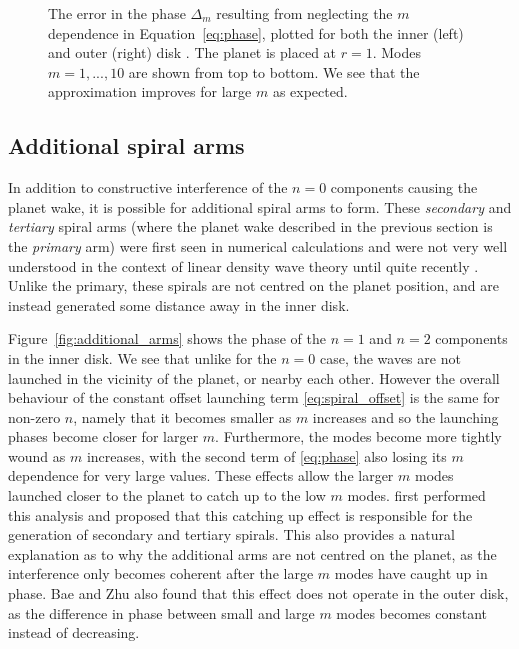 \begin{figure}
\begin{subfigure}[b]{0.49\textwidth}
        \label{fig:delta_m_outer}
    \end{subfigure}
       \caption{The error in the phase $\Delta_m$ resulting from neglecting the $m$ dependence in Equation~\eqref{eq:phase}, plotted for both the inner (left) and outer (right) disk \citep{ogilvie2002}.
       The planet is placed at $r=1$. Modes $m=1,...,10$ are shown from top to bottom.
       We see that the approximation improves for large $m$ as expected.}
       \label{fig:delta_m}
\end{figure}

\subsection{Additional spiral arms}

In addition to constructive interference of the $n=0$ components causing the planet wake, it is possible for additional spiral arms to form.
These \textit{secondary} and \textit{tertiary} spiral arms (where the planet wake described in the previous section is the \textit{primary} arm) were first seen in numerical calculations \citep{fung2015} and were not very well understood in the context of linear density wave theory until quite recently \citep{bae2018a,miranda2019a}.
Unlike the primary, these spirals are not centred on the planet position, and are instead generated some distance away in the inner disk.

Figure~\ref{fig:additional_arms} shows the phase of the $n=1$ and $n=2$ components in the inner disk.
We see that unlike for the $n=0$ case, the waves are not launched in the vicinity of the planet, or nearby each other.
However the overall behaviour of the constant offset launching term \eqref{eq:spiral_offset} is the same for non-zero $n$, namely that it becomes smaller as $m$ increases and so the launching phases become closer for larger $m$.
Furthermore, the modes become more tightly wound as $m$ increases, with the second term of \eqref{eq:phase} also losing its $m$ dependence for very large values.
These effects allow the larger $m$ modes launched closer to the planet to catch up to the low $m$ modes.
\citet{bae2018a} first performed this analysis and proposed that this catching up effect is responsible for the generation of secondary and tertiary spirals.
This also provides a natural explanation as to why the additional arms are not centred on the planet, as the interference only becomes coherent after the large $m$ modes have caught up in phase.
Bae and Zhu also found that this effect does not operate in the outer disk, as the difference in phase between small and large $m$ modes becomes constant instead of decreasing.

